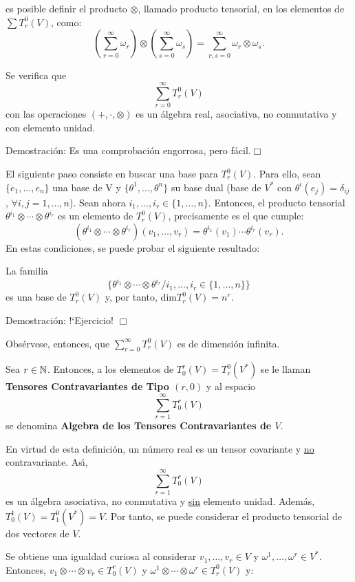 \documentclass[cursovd_portada.tex]{subfiles}
\begin{document}
es posible definir el producto $\otimes$, llamado producto tensorial, en los elementos de $\sum T^0_r(V)$, como:
$$(\sum_{r=0}^\infty\omega_r)\otimes(\sum_{s=0}^\infty\omega_s)=\sum_{r,s=0}^
\infty\omega_r\otimes\omega_s.$$
\begin{propoap} Se verifica que
$$\sum_{r=0}^\infty T^0_r(V)$$
con las operaciones $(+,\cdot,\otimes)$ es un \'{a}lgebra real, asociativa, no conmutativa y con elemento unidad.
\end{propoap}
{\sc Demostraci\'{o}n:} Es una comprobaci\'{o}n engorrosa, pero f\'{a}cil.\hfill$\Box$
\par\bigskip
El siguiente paso consiste en buscar una base para $T^0_r(V)$. Para ello, sean $\{e_1,\dots ,e_n\}$ una base de V
y $\{\theta^1,\dots ,\theta^n\}$ su base dual (base de $V^*$ con $\theta^i(e_j)=\delta_{ij}$, $\forall i,j=1,\dots
, n$). Sean ahora $i_1,\dots ,i_r\in \{1,\dots, n\}$. Entonces, el producto tensorial
$\theta^{i_1}\otimes\cdots\otimes\theta^{i_r}$ es un elemento de $T^0_r(V)$, precisamente es el que cumple:
$$(\theta^{i_1}\otimes\cdots\otimes\theta^{i_r})(v_1,\dots,v_r)
=\theta^{i_1}(v_1)\cdots\theta^{i_r}(v_r).$$ En estas condiciones, se puede probar el siguiente resultado:
\begin{propoap}
La familia
$$\{\theta^{i_1}\otimes\cdots\otimes\theta^{i_r}/i_1,\dots ,i_r\in\{1,\dots,
n\}\}$$ es una base de $T^0_r(V)$ y, por tanto, dim$T^0_r(V)=n^r$.
\end{propoap}
{\sc Demostraci\'{o}n:} !`Ejercicio! \hfill$\Box$
\par\bigskip
Obs\'{e}rvese, entonces, que $\sum_{r=0}^{\infty}T^0_r(V)$ es de dimensi\'{o}n infinita.
\begin{defiap}
Sea $r\in\mathbb{N}$. Entonces, a los elementos de $T^r_0(V) = T^0_r(V^*)$ se le llaman {\bf Tensores Contravariantes de
Tipo $(r,0)$} y al espacio
$$\sum_{r=1}^\infty T^r_0(V)$$
se denomina {\bf Algebra de los Tensores Contravariantes de $V$}.
\end{defiap}
\par\bigskip
En virtud de esta definici\'{o}n, un n\'{u}mero real es un tensor covariante y \underline{no} contravariante. As\'{\i},
$$\sum_{r=1}^{\infty} T^r_0(V)$$
es un \'{a}lgebra asociativa, no conmutativa y \underline{sin} elemento unidad. Adem\'{a}s, $T^1_0(V) =T^0_1(V^*) =V$. Por
tanto, se puede considerar el producto tensorial de dos vectores de $V$.
\par
Se obtiene una igualdad curiosa al considerar $v_1,\dots ,v_r \in V$ y $\omega^1,\dots ,\omega^r\in V^*$.
Entonces, $v_1\otimes\cdots\otimes v_r\in T^r_0(V)$ y $\omega^1\otimes\cdots\otimes\omega^r\in T^0_r(V)$ y:
\end{document}
